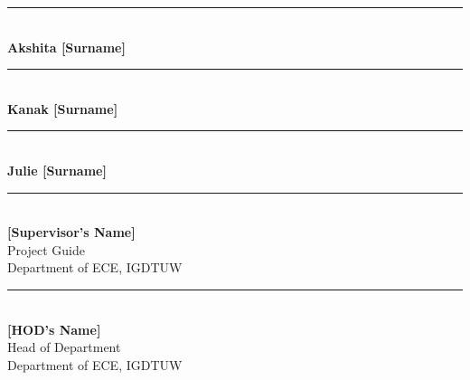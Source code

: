 \vspace{1.4cm}

\noindent
\begin{minipage}[t]{0.32\textwidth}\centering
    \rule{3.8cm}{0.4pt}\\
    \textbf{Akshita [Surname]}\\
    [Enrollment No.]
\end{minipage}\hfill
\begin{minipage}[t]{0.32\textwidth}\centering
    \rule{3.8cm}{0.4pt}\\
    \textbf{Kanak [Surname]}\\
    [Enrollment No.]
\end{minipage}\hfill
\begin{minipage}[t]{0.32\textwidth}\centering
    \rule{3.8cm}{0.4pt}\\
    \textbf{Julie [Surname]}\\
    [Enrollment No.]
\end{minipage}

\vspace{1.8cm}

\noindent
\begin{minipage}[t]{0.48\textwidth}
    \rule{5cm}{0.4pt}\\
    \textbf{[Supervisor's Name]}\\
    Project Guide\\
    Department of ECE, IGDTUW
\end{minipage}
\hfill
\begin{minipage}[t]{0.48\textwidth}
    \raggedleft
    \rule{5cm}{0.4pt}\\
    \textbf{[HOD's Name]}\\
    Head of Department\\
    Department of ECE, IGDTUW
\end{minipage}

\clearpage
